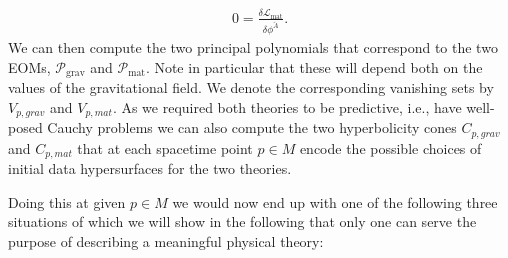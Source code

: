 \begin{align}
    0 = \frac{\delta \mathcal{L}_{\text{mat}}}{\delta \phi^{\tilde{A}}}.
\end{align}
We can then compute the two principal polynomials that correspond to the two EOMs, $\mathcal{P}_{\text{grav}}$ and $\mathcal{P}_{\text{mat}}$. Note in particular that these will depend both on the values of the gravitational field. We denote the corresponding vanishing sets by $V_{p,grav}$ and $V_{p,mat}$. As we required both theories to be predictive, i.e., have well-posed Cauchy problems we can also compute the two hyperbolicity cones $C_{p,grav}$ and $C_{p,mat}$ that at each spacetime point $p\in M$ encode the possible choices of initial data hypersurfaces for the two theories. 

Doing this at given $p \in M$ we would now end up with one of the following three situations of which we will show in the following that only one can serve the purpose of describing a meaningful physical theory:
